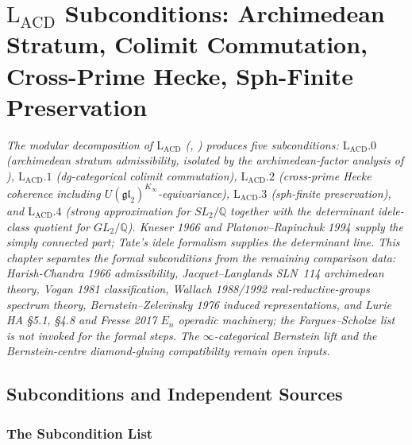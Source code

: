 \chapter{\(\mathrm{L}_{\mathrm{ACD}}\) Subconditions: Archimedean Stratum, Colimit Commutation, Cross-Prime Hecke, Sph-Finite Preservation}
\label{v4-arith:lacd-sub}

\emph{The modular decomposition of \(\mathrm{L}_{\mathrm{ACD}}\)
(,
) produces five subconditions:
\(\mathrm{L}_{\mathrm{ACD}}.0\) (archimedean stratum admissibility,
isolated by the archimedean-factor analysis of
),
\(\mathrm{L}_{\mathrm{ACD}}.1\) (dg-categorical colimit commutation),
\(\mathrm{L}_{\mathrm{ACD}}.2\) (cross-prime Hecke coherence
including \(U(\mathfrak{gl}_{2})^{K_{\infty}}\)-equivariance),
\(\mathrm{L}_{\mathrm{ACD}}.3\) (sph-finite preservation), and
\(\mathrm{L}_{\mathrm{ACD}}.4\) (strong approximation for
\(SL_{2}/\mathbb{Q}\) together with the determinant idele-class
quotient for \(GL_{2}/\mathbb{Q}\)). Kneser 1966 and
Platonov--Rapinchuk 1994 supply the simply connected part; Tate's
idele formalism supplies the determinant line. This chapter separates the formal
subconditions from the remaining comparison data: Harish-Chandra 1966
admissibility, Jacquet--Langlands SLN~114 archimedean theory, Vogan
1981 classification, Wallach 1988/1992 real-reductive-groups spectrum
theory, Bernstein--Zelevinsky 1976 induced representations, and
Lurie HA \S5.1, \S4.8 and Fresse 2017 \(E_{n}\) operadic machinery;
the Fargues--Scholze list is not invoked for the formal steps.
The \(\infty\)-categorical Bernstein lift and the Bernstein-centre
diamond-gluing compatibility remain open inputs.}

\section{Subconditions and Independent Sources}
\label{v4-arith:lacd:context}

\subsection{The Subcondition List}

